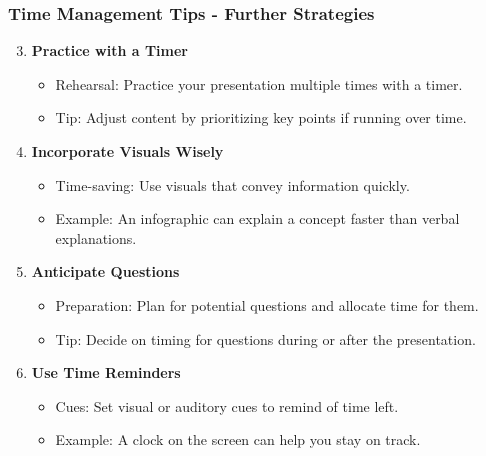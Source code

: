 \documentclass[aspectratio=169]{beamer}
\begin{document}
\begin{frame}[fragile]
    \frametitle{Time Management Tips - Further Strategies}
    \begin{enumerate}
        \setcounter{enumi}{2} %
        \item \textbf{Practice with a Timer}
            \begin{itemize}
                \item Rehearsal: Practice your presentation multiple times with a timer.
                \item Tip: Adjust content by prioritizing key points if running over time.
            \end{itemize}

        \item \textbf{Incorporate Visuals Wisely}
            \begin{itemize}
                \item Time-saving: Use visuals that convey information quickly.
                \item Example: An infographic can explain a concept faster than verbal explanations.
            \end{itemize}

        \item \textbf{Anticipate Questions}
            \begin{itemize}
                \item Preparation: Plan for potential questions and allocate time for them.
                \item Tip: Decide on timing for questions during or after the presentation.
            \end{itemize}
        
        \item \textbf{Use Time Reminders}
            \begin{itemize}
                \item Cues: Set visual or auditory cues to remind of time left.
                \item Example: A clock on the screen can help you stay on track.
            \end{itemize}
    \end{enumerate}
\end{frame}
\end{document}
